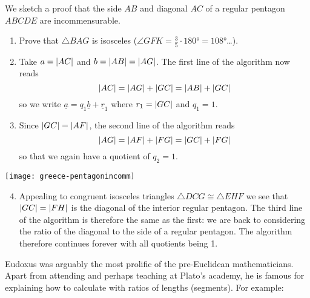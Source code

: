\goodbreak

\label{ex:theaetetus} We sketch a proof that the side $AB$ and diagonal $AC$ of a regular pentagon $ABCDE$ are incommensurable.\par
\begin{minipage}[t]{0.65\linewidth}\vspace{-5pt}
	\begin{enumerate}\itemsep0pt
	  \item Prove that $\triangle BAG$ is isosceles ($\angle GFK=\frac 35\cdot\ang{180}=\ang{108}$\ldots).
	  \item Take $a=\left| AC\right|$ and $b=\left| AB\right|=\left| AG\right|$. The first line of the algorithm now reads
	  \[
	  	\left| AC\right|=\left| AG\right|+\left| GC\right|=\left| AB\right|+\left| GC\right|
	  \]
	  so we write $\underline a=q_1\underline b+\underline r_1$ where $r_1=\left| GC\right|$ and $q_1=1$.
	  \item Since $\left| GC\right|=\left| AF\right|$, the second line of the algorithm reads
	  \[
	  	\left| AG\right|=\left| AF\right|+\left| FG\right|=\left| GC\right|+\left| FG\right|
	  \]
	  so that we again have a quotient of $q_2=1$.
	\end{enumerate}
\end{minipage}
\hfill
\begin{minipage}[t]{0.34\textwidth}\vspace{-5pt}
	\flushright
	\texttt{[image: greece-pentagonincomm]}
\end{minipage}
	
	
\begin{enumerate}\setcounter{enumi}{3}
	\item Appealing to congruent isosceles triangles $\triangle DCG\cong\triangle EHF$ we see that $\left| GC\right|=\left| FH\right|$ is the diagonal of the interior regular pentagon. The third line of the algorithm is therefore the same as the first: we are back to considering the ratio of the diagonal to the side of a regular pentagon. The algorithm therefore continues forever with all quotients being 1.
\end{enumerate}
	
\goodbreak



\label{pg:eudoxus}

Eudoxus was arguably the most prolific of the pre-Euclidean mathematicians. Apart from attending and perhaps teaching at Plato's academy, he is famous for explaining how to calculate with ratios of lengths (segments). For example:

